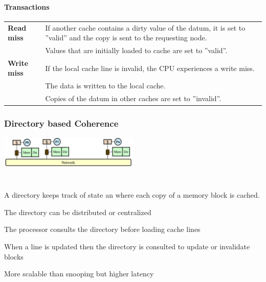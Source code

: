 			\paragraph{Transactions}
			
			\begin{tabular}{|>{\bfseries}p{}|p{}|}
				\hline
				Read miss
					& If another cache contains a dirty value of the datum, it is set to ''valid'' and the copy is sent to the requesting node.\\
					& Values that are initially loaded to cache are set to ''valid''.\\
				\hline
				Write miss
					& If the local cache line is invalid, the CPU experiences a write miss.\\
					& The data is written to the local cache.\\
					& Copies of the datum in other caches are set to ''invalid''.\\ 
				\hline
			\end{tabular}
		
		\subsubsection{Directory based Coherence }
				\begin{multicols}{2}
				\includegraphics[width=0.5\textwidth]{./pictures/directory.png} \\ \ \\ \ \\
				A directory keeps track of state an where each copy of a memory block is cached.
				\begin{compactitem}
					\item The directory can be distributed or centralized
					\item The processor consults the directory before loading cache lines
					\item When a line is updated then the directory is consulted to update or invalidate blocks
					\item More scalable than snooping but higher latency
				\end{compactitem}
			\end{multicols}